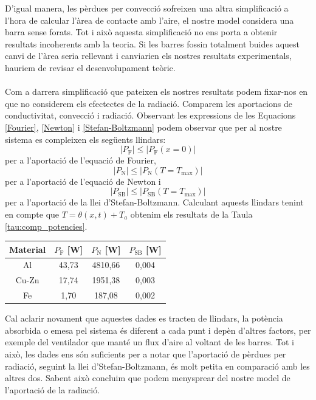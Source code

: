 \documentclass[12pt,twosides,onecolumn,openany]{article}
\newenvironment{Figura}
  {\par\medskip\noindent\minipage{\linewidth}}
  {\endminipage\par\medskip}
\begin{document}
\begin{multicols}{2}
D'igual manera, les pèrdues per convecció sofreixen una altra simplificació a l'hora de calcular l'àrea de contacte amb l'aire, el nostre model considera una barra sense forats. Tot i això aquesta simplificació no ens porta a obtenir resultats incoherents amb la teoria. Si les barres fossin totalment buides aquest canvi de l'àrea seria rellevant i canviarien els nostres resultats experimentals, hauriem de revisar el desenvolupament teòric.\\\\
Com a darrera simplificació que pateixen els nostres resultats podem fixar-nos en que no considerem els efectectes de la radiació. Comparem les aportacions de conductivitat, convecció i radiació. Observant les expressions de les Equacions \eqref{Fourier}, \eqref{Newton} i \eqref{Stefan-Boltzmann} podem observar que per al nostre sistema es compleixen els següents llindars:
\begin{equation*}
  \left|{P_{\text{F}}}\right| \leq \left| P_{\text{F}}(x=0) \right| 
\end{equation*}
per a l'aportació de l'equació de Fourier,
\begin{equation*}
  \left|P_{\text{N}} \right| \leq \left| P_{\text{N}}(T=T_{\text{max}}) \right|
\end{equation*}
per a l'aportació de l'equació de Newton i
\begin{equation*}
  \left|P_{\text{SB}} \right| \leq \left| P_{\text{SB}}(T=T_{\text{max}}) \right|
\end{equation*}
per a l'aportació de la llei d'Stefan-Boltzmann. Calculant aquests llindars tenint en compte que $T = \theta(x,t) + T_a$ obtenim els resultats de la Taula \ref{tau:comp_potencies}.
\begin{Figura}
  \centering
  \begin{tabular}{c|c|c|c}
    Material & $P_{\text{F}}$ [W] & $P_{\text{N}}$ [W] & $P_{\text{SB}}$ [W]\\ \hline\hline
    Al & 43,73 & 4810,66 & 0,004\\
    Cu-Zn & 17,74 & 1951,38 & 0,003\\
    Fe & 1,70 & 187,08 & 0,002
  \end{tabular}
  \label{tau:comp_potencies}
\end{Figura}
Cal aclarir novament que aquestes dades es tracten de llindars, la potència absorbida o emesa pel sistema és diferent a cada punt i depèn d'altres factors, per exemple del ventilador que manté un flux d'aire al voltant de les barres. Tot i això, les dades ens són suficients per a notar que l'aportació de pèrdues per radiació, seguint la llei d'Stefan-Boltzmann, és molt petita en comparació amb les altres dos. Sabent això concluim que podem menysprear del nostre model de l'aportació de la radiació.

\end{multicols}
\end{document}
